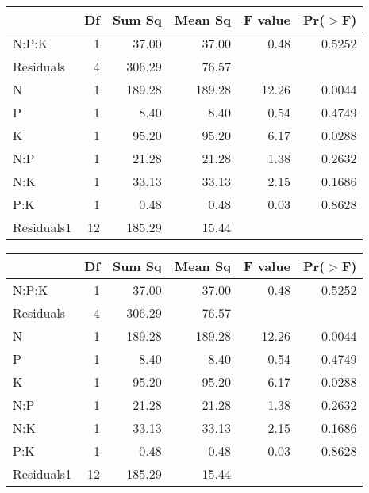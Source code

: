 \begin{table}[ht]
\centering
\begin{tabular}{lrrrrr}
  \hline
 & Df & Sum Sq & Mean Sq & F value & Pr($>$F) \\ 
  \hline
N:P:K     & 1 & 37.00 & 37.00 & 0.48 & 0.5252 \\ 
  Residuals & 4 & 306.29 & 76.57 &  &  \\ 
  N         & 1 & 189.28 & 189.28 & 12.26 & 0.0044 \\ 
  P         & 1 & 8.40 & 8.40 & 0.54 & 0.4749 \\ 
  K         & 1 & 95.20 & 95.20 & 6.17 & 0.0288 \\ 
  N:P       & 1 & 21.28 & 21.28 & 1.38 & 0.2632 \\ 
  N:K       & 1 & 33.13 & 33.13 & 2.15 & 0.1686 \\ 
  P:K       & 1 & 0.48 & 0.48 & 0.03 & 0.8628 \\ 
  Residuals1 & 12 & 185.29 & 15.44 &  &  \\ 
   \hline
\end{tabular}
\end{table}
\begin{table}[ht]
\centering
\begin{tabular}{lrrrrr}
  \hline
 & Df & Sum Sq & Mean Sq & F value & Pr($>$F) \\ 
  \hline
N:P:K     & 1 & 37.00 & 37.00 & 0.48 & 0.5252 \\ 
  Residuals & 4 & 306.29 & 76.57 &  &  \\ 
  N         & 1 & 189.28 & 189.28 & 12.26 & 0.0044 \\ 
  P         & 1 & 8.40 & 8.40 & 0.54 & 0.4749 \\ 
  K         & 1 & 95.20 & 95.20 & 6.17 & 0.0288 \\ 
  N:P       & 1 & 21.28 & 21.28 & 1.38 & 0.2632 \\ 
  N:K       & 1 & 33.13 & 33.13 & 2.15 & 0.1686 \\ 
  P:K       & 1 & 0.48 & 0.48 & 0.03 & 0.8628 \\ 
  Residuals1 & 12 & 185.29 & 15.44 &  &  \\ 
   \hline
\end{tabular}
\end{table}
\clearpage
